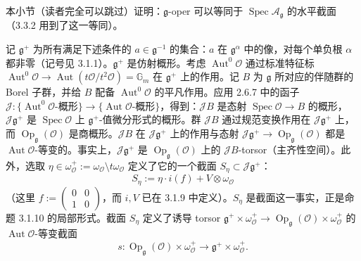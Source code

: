  本小节（读者完全可以跳过）证明：$\mathfrak{g}$-oper 可以等同于 $\operatorname{Spec}\mathcal{A}_{\mathfrak{g}}$ 的水平截面（3.3.2 用到了这一等同）。

记 $\mathfrak{g}^{+}$ 为所有满足下述条件的 $a\in\mathfrak{g}^{-1}$ 的集合：$a$ 在 $\mathfrak{g}^{\alpha}$ 中的像，对每个单负根 $\alpha$ 都非零（记号见 3.1.1）。$\mathfrak{g}^{+}$ 是仿射概形。考虑 $\operatorname{Aut}^{0}\mathcal{O}$ 通过标准特征标 $\operatorname{Aut}^{0}\mathcal{O}\to\operatorname{Aut}(t\mathcal{O}/t^{2}\mathcal{O})=\mathbb{G}_{m}$ 在 $\mathfrak{g}^{+}$ 上的作用。记 $B$ 为 $\mathfrak{g}$ 所对应的伴随群的 Borel 子群，并给 $B$ 配备 $\operatorname{Aut}^{0}\mathcal{O}$ 的平凡作用。应用 2.6.7 中的函子 $\mathcal{J}:\{\operatorname{Aut}^{0}\mathcal{O}\text{-概形}\}\to\{\operatorname{Aut}\mathcal{O}\text{-概形}\}$，得到：$\mathcal{J}B$ 是态射 $\operatorname{Spec}\mathcal{O}\to B$ 的概形，$\mathcal{J}\mathfrak{g}^{+}$ 是 $\operatorname{Spec}\mathcal{O}$ 上 $\mathfrak{g}^{+}$-值微分形式的概形。群 $\mathcal{J}B$ 通过规范变换作用在 $\mathcal{J}\mathfrak{g}^{+}$ 上，而 $\operatorname{Op}_{\mathfrak{g}}(\mathcal{O})$ 是商概形。$\mathcal{J}B$ 在 $\mathcal{J}\mathfrak{g}^{+}$ 上的作用与态射 $\mathcal{J}\mathfrak{g}^{+}\to\operatorname{Op}_{\mathfrak{g}}(\mathcal{O})$ 都是 $\operatorname{Aut}\mathcal{O}$-等变的。事实上，$\mathcal{J}\mathfrak{g}^{+}$ 是 $\operatorname{Op}_{\mathfrak{g}}(\mathcal{O})$ 上的 $\mathcal{J}B$-torsor（主齐性空间）。此外，选取 $\eta\in\omega_{\mathcal{O}}^{+}:=\omega_{\mathcal{O}}\setminus t\omega_{\mathcal{O}}$ 定义了它的一个截面 $S_{\eta}\subset\mathcal{J}\mathfrak{g}^{+}$：
\[
  S_{\eta}:=\eta\cdot i(f)+V\otimes\omega_{\mathcal{O}}
\]
（这里 $f:=\begin{pmatrix}0&0\\1&0\end{pmatrix}$，而 $i,V$ 已在 3.1.9 中定义）。$S_{\eta}$ 是截面这一事实，正是命题 3.1.10 的局部形式。截面 $S_{\eta}$ 定义了诱导 torsor $\mathfrak{g}^{+}\times\omega_{\mathcal{O}}^{+}\to\operatorname{Op}_{\mathfrak{g}}(\mathcal{O})\times\omega_{\mathcal{O}}^{+}$ 的 $\operatorname{Aut}\mathcal{O}$-等变截面
\[
  s : \operatorname{Op}_{\mathfrak{g}}(\mathcal{O})\times\omega_{\mathcal{O}}^{+}\longrightarrow\mathfrak{g}^{+}\times\omega_{\mathcal{O}}^{+}.
\]

